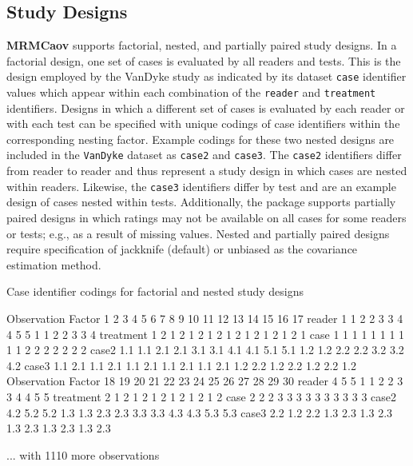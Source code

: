 \documentclass[
]{jss}
\begin{document}
\hypertarget{study-designs}{%
\subsection{Study Designs}\label{study-designs}}

\textbf{MRMCaov} supports factorial, nested, and partially paired study
designs. In a factorial design, one set of cases is evaluated by all
readers and tests. This is the design employed by the VanDyke study as
indicated by its dataset \texttt{case} identifier values which appear
within each combination of the \texttt{reader} and \texttt{treatment}
identifiers. Designs in which a different set of cases is evaluated by
each reader or with each test can be specified with unique codings of
case identifiers within the corresponding nesting factor. Example
codings for these two nested designs are included in the
\texttt{VanDyke} dataset as \texttt{case2} and \texttt{case3}. The
\texttt{case2} identifiers differ from reader to reader and thus
represent a study design in which cases are nested within readers.
Likewise, the \texttt{case3} identifiers differ by test and are an
example design of cases nested within tests. Additionally, the package
supports partially paired designs in which ratings may not be available
on all cases for some readers or tests; e.g., as a result of missing
values. Nested and partially paired designs require specification of
jackknife (default) or unbiased as the covariance estimation method.

\begin{CodeChunk}
\begin{CodeOutput}
Case identifier codings for factorial and nested study designs
\end{CodeOutput}
\begin{CodeOutput}
           Observation
Factor      1   2   3   4   5   6   7   8   9   10  11  12  13  14  15  16  17 
  reader    1   1   2   2   3   3   4   4   5   5   1   1   2   2   3   3   4  
  treatment 1   2   1   2   1   2   1   2   1   2   1   2   1   2   1   2   1  
  case      1   1   1   1   1   1   1   1   1   1   2   2   2   2   2   2   2  
  case2     1.1 1.1 2.1 2.1 3.1 3.1 4.1 4.1 5.1 5.1 1.2 1.2 2.2 2.2 3.2 3.2 4.2
  case3     1.1 2.1 1.1 2.1 1.1 2.1 1.1 2.1 1.1 2.1 1.2 2.2 1.2 2.2 1.2 2.2 1.2
           Observation
Factor      18  19  20  21  22  23  24  25  26  27  28  29  30 
  reader    4   5   5   1   1   2   2   3   3   4   4   5   5  
  treatment 2   1   2   1   2   1   2   1   2   1   2   1   2  
  case      2   2   2   3   3   3   3   3   3   3   3   3   3  
  case2     4.2 5.2 5.2 1.3 1.3 2.3 2.3 3.3 3.3 4.3 4.3 5.3 5.3
  case3     2.2 1.2 2.2 1.3 2.3 1.3 2.3 1.3 2.3 1.3 2.3 1.3 2.3
\end{CodeOutput}
\begin{CodeOutput}
... with 1110 more observations
\end{CodeOutput}
\end{CodeChunk}
\end{document}
